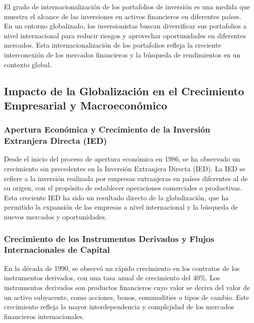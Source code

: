 \documentclass[
  letterpaper,
  DIV=11,
  numbers=noendperiod]{scrartcl}
\begin{document}
El grado de internacionalización de los portafolios de inversión es una
medida que muestra el alcance de las inversiones en activos financieros
en diferentes países. En un entorno globalizado, los inversionistas
buscan diversificar sus portafolios a nivel internacional para reducir
riesgos y aprovechar oportunidades en diferentes mercados. Esta
internacionalización de los portafolios refleja la creciente
interconexión de los mercados financieros y la búsqueda de rendimientos
en un contexto global.

\hypertarget{impacto-de-la-globalizaciuxf3n-en-el-crecimiento-empresarial-y-macroeconuxf3mico}{%
\subsection{Impacto de la Globalización en el Crecimiento Empresarial y
Macroeconómico}\label{impacto-de-la-globalizaciuxf3n-en-el-crecimiento-empresarial-y-macroeconuxf3mico}}

\hypertarget{apertura-econuxf3mica-y-crecimiento-de-la-inversiuxf3n-extranjera-directa-ied}{%
\subsubsection{Apertura Económica y Crecimiento de la Inversión
Extranjera Directa
(IED)}\label{apertura-econuxf3mica-y-crecimiento-de-la-inversiuxf3n-extranjera-directa-ied}}

Desde el inicio del proceso de apertura económica en 1986, se ha
observado un crecimiento sin precedentes en la Inversión Extranjera
Directa (IED). La IED se refiere a la inversión realizada por empresas
extranjeras en países diferentes al de su origen, con el propósito de
establecer operaciones comerciales o productivas. Esta creciente IED ha
sido un resultado directo de la globalización, que ha permitido la
expansión de las empresas a nivel internacional y la búsqueda de nuevos
mercados y oportunidades.

\hypertarget{crecimiento-de-los-instrumentos-derivados-y-flujos-internacionales-de-capital}{%
\subsubsection{Crecimiento de los Instrumentos Derivados y Flujos
Internacionales de
Capital}\label{crecimiento-de-los-instrumentos-derivados-y-flujos-internacionales-de-capital}}

En la década de 1990, se observó un rápido crecimiento en los contratos
de los instrumentos derivados, con una tasa anual de crecimiento del
40\%. Los instrumentos derivados son productos financieros cuyo valor se
deriva del valor de un activo subyacente, como acciones, bonos,
commodities o tipos de cambio. Este crecimiento refleja la mayor
interdependencia y complejidad de los mercados financieros
internacionales.
\end{document}
